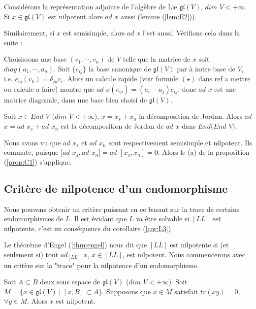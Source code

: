 \documentclass[a4paper,openany,12pt]{report}
\newcommand{\gl}{\mathfrak{gl}}
\theoremstyle{break}
{\theorembodyfont{\upshape}
\newtheorem*{rmq}{Remarque :}
\newtheorem*{prv}{Preuve :}
\newtheorem*{ex}{Exemples :}
\newtheorem{exe}{Exemple : }
\newtheorem*{nota}{Notation :}}
\begin{document}
\begin{ex}
Considérons la représentation adjointe de l'algèbre de Lie $\gl(V)$, $dim$ $V < +\infty$. Si $x \in \gl(V)$ est nilpotent alors $ad$ $x$ aussi (lemme (\ref{lem:E2})).

Similairement, si $x$ est semisimple, alors $ad$ $x$ l'est aussi. Vérifions cela dans la suite : 

Choisissons une base $(v_{1},\cdots,v_{n})$ de $V$ telle que la matrice de $x$ soit $diag(a_{1},\cdots,a_{n})$. Soit $\{ e_{ij} \}$ la base canonique de $\gl(V)$ par à notre base de $V$, i.e. $e_{ij}(v_{k})=\delta_{jk}v_{i}$. Alors un calcule rapide (voir formule $(\star)$ dans ref a mettre ou calcule a faire) montre que $ad$ $x(e_{ij})=(a_{i}-a_{j})e_{ij}$, donc $ad$ $x$ est une matrice diagonale, dans une base bien choisi de $\gl(V)$. 
\end{ex}

\begin{lem}\label{lem:C1}
\quad Soit $x \in End$ $V$ ($dim$ $V < +\infty$), $x=x_{s}+x_{n}$ la décomposition de Jordan. Alors $ad$ $x = ad$ $x_{s}+ad$ $x_{n}$ est la décomposition de Jordan de $ad$ $x$ dans $End(End$ $V)$.
\end{lem}

\begin{prv}
\quad Nous avons vu que $ad$ $x_{s}$ et $ad$ $x_{n}$ sont respectivement semisimple et nilpotent. Ils commute, puisque $[ad$ $x_{s},ad$ $x_{n}] = ad$ $[x_{s},x_{n}]=0$. Alors le (a) de la proposition (\ref{prop:C1}) s'applique.
\end{prv}

\subsection{Critère de nilpotence d'un endomorphisme}\label{a}

\quad Nous pouvons obtenir un critère puissant en ce basant sur la trace de certains endomorphismes de $L$. Il est évidant que $L$ va être solvable si $[LL]$ est nilpotente, c'est un conséquence du corollaire (\ref{cor:L3}).
 
\quad Le théorème d'Engel (\ref{thm:engel}) nous dit que $[LL]$ est nilpotente si (et seulement si) tout $ad_{[LL]}$ $x$, $x \in [LL]$, est nilpotent. Nous commencerons avec un critère sur la "trace" pour la nilpotence d'un endomorphisme.

\begin{lem}\label{lem:C2}
\quad Soit $A \subset B$ deux sous espace de $\gl(V)$ ($dim$ $V<+\infty$). Soit $M= \{ x \in \gl(V) \mid [x,B] \subset A \}$. Supposons que $x \in M$ satisfait $tr(xy)=0$, $\forall y \in M$.
Alors $x$ est nilpotent. 
\end{lem}
\end{document}
